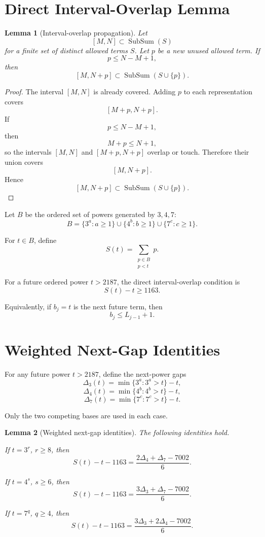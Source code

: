 \documentclass[11pt]{article}
\newtheorem{lemma}{Lemma}
\newcommand{\SubSum}{\operatorname{SubSum}}
\begin{document}
\section{Direct Interval-Overlap Lemma}

\begin{lemma}[Interval-overlap propagation]
Let
\[
[M,N]\subset \SubSum(S)
\]
for a finite set of distinct allowed terms \(S\). Let \(p\) be a new unused allowed term. If
\[
p\le N-M+1,
\]
then
\[
[M,N+p]\subset \SubSum(S\cup\{p\}).
\]
\end{lemma}

\begin{proof}
The interval \([M,N]\) is already covered. Adding \(p\) to each representation covers
\[
[M+p,N+p].
\]
If
\[
p\le N-M+1,
\]
then
\[
M+p\le N+1,
\]
so the intervals \([M,N]\) and \([M+p,N+p]\) overlap or touch. Therefore their union covers
\[
[M,N+p].
\]
Hence
\[
[M,N+p]\subset \SubSum(S\cup\{p\}).
\]
\end{proof}

Let \(B\) be the ordered set of powers generated by \(3,4,7\):
\[
B=\{3^a:a\ge1\}\cup\{4^b:b\ge1\}\cup\{7^c:c\ge1\}.
\]

For \(t\in B\), define
\[
S(t)=\sum_{\substack{p\in B\\p<t}}p.
\]

For a future ordered power \(t>2187\), the direct interval-overlap condition is
\[
S(t)-t\ge1163.
\]

Equivalently, if \(b_j=t\) is the next future term, then
\[
b_j\le L_{j-1}+1.
\]

\section{Weighted Next-Gap Identities}

For any future power \(t>2187\), define the next-power gaps
\[
\Delta_3(t)=\min\{3^a:3^a>t\}-t,
\]
\[
\Delta_4(t)=\min\{4^b:4^b>t\}-t,
\]
\[
\Delta_7(t)=\min\{7^c:7^c>t\}-t.
\]

Only the two competing bases are used in each case.

\begin{lemma}[Weighted next-gap identities]
The following identities hold.

If \(t=3^r\), \(r\ge8\), then
\[
S(t)-t-1163
=
\frac{2\Delta_4+\Delta_7-7002}{6}.
\]

If \(t=4^s\), \(s\ge6\), then
\[
S(t)-t-1163
=
\frac{3\Delta_3+\Delta_7-7002}{6}.
\]

If \(t=7^q\), \(q\ge4\), then
\[
S(t)-t-1163
=
\frac{3\Delta_3+2\Delta_4-7002}{6}.
\]
\end{lemma}
\end{document}
